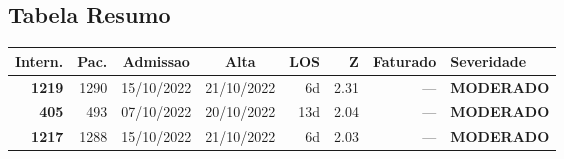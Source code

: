 \documentclass[a4paper,10pt]{article}
\begin{document}
\subsection{Tabela Resumo}
\begin{center}
\begin{longtable}{>{\scriptsize}r>{\scriptsize}r>{\scriptsize}c>{\scriptsize}c>{\scriptsize}r>{\scriptsize}r>{\scriptsize}r>{\scriptsize}l}
\toprule
\textbf{Intern.} & \textbf{Pac.} & \textbf{Admissao} & \textbf{Alta} & \textbf{LOS} & \textbf{Z} & \textbf{Faturado} & \textbf{Severidade} \\
\midrule
\endhead
\bottomrule
\endfoot

\textcolor{anomyellow}{\textbf{1219}} & 1290 & 15/10/2022 & 21/10/2022 & 6d & \textcolor{anomyellow}{2.31} & --- & \textcolor{anomyellow}{\textbf{MODERADO}} \\

\textcolor{anomyellow}{\textbf{405}} & 493 & 07/10/2022 & 20/10/2022 & 13d & \textcolor{anomyellow}{2.04} & --- & \textcolor{anomyellow}{\textbf{MODERADO}} \\

\textcolor{anomyellow}{\textbf{1217}} & 1288 & 15/10/2022 & 21/10/2022 & 6d & \textcolor{anomyellow}{2.03} & --- & \textcolor{anomyellow}{\textbf{MODERADO}} \\

\end{longtable}\end{center}
\end{document}
